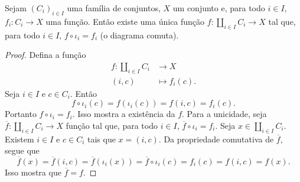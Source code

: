 \begin{prop}
Sejam $(C_i)_{i \in I}$ uma família de conjuntos, $X$ um conjunto e, para todo $i \in I$, $f_i: C_i \to X$ uma função. Então existe uma única função $f: \coprod_{i \in I} C_i \to X$ tal que, para todo $i \in I$, $f \circ \iota_i = f_i$ (o diagrama comuta).
\begin{figure}[!h]
\centering
{}
\end{figure}
\end{prop}
\begin{proof}
Defina a função
	\begin{align*}
	f: \coprod_{i \in I} C_i &\to X \\
		(i,c) &\mapsto f_i(c).
	\end{align*}
Seja $i \in I$ e $c \in C_i$. Então
	\begin{equation*}
	f \circ \iota_i(c) = f(\iota_i(c)) = f(i,c) = f_i(c).
	\end{equation*}
Portanto $f \circ \iota_i = f_i$. Isso mostra a existência da $f$. Para a unicidade, seja $\overline{f}: \coprod_{i \in I} C_i \to X$ função tal que, para todo $i \in I$, $\overline{f} \circ \iota_i = f_i$. Seja $x \in \coprod_{i \in I} C_i$. Existem $i \in I$ e $c \in C_i$ tais que $x=(i,c)$. Da propriedade comutativa de $\overline{f}$, segue que
	\begin{equation*}
	\overline{f}(x) = \overline{f}(i,c) = \overline{f}(\iota_i(x)) = \overline{f} \circ \iota_i(c) = f_i(c) = f(i,c) = f(x).
	\end{equation*}
Isso mostra que $\overline{f}=f$.
\end{proof}







